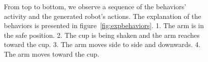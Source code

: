 \begin{figure}[htbp]
        \hfill
        \hfill

  \caption[Behaviors and robot's actions]{From top to bottom, we
  observe a sequence of the behaviors' activity  and the generated
  robot's actions. The explanation of the behaviors is presented in
  figure~\ref{fig:expbehaviors}. 1. The arm is in the safe
  position. 2. The cup is being shaken and the arm reaches toward
  the cup. 3. The arm moves side to side and downwards. 4. The arm
  moves toward the cup.
  } \label{fig:bsteps}
\end{figure}

